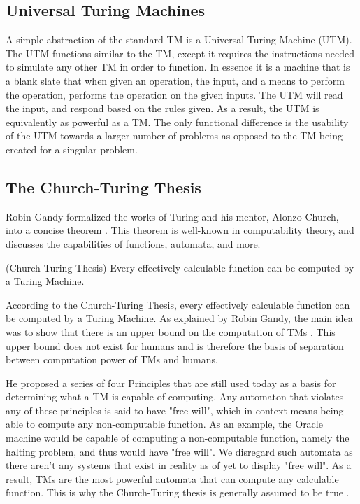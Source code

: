 \subsection{Universal Turing Machines}\label{subsec:UTM}

A simple abstraction of the standard TM is a Universal Turing Machine (UTM).
The UTM functions similar to the TM, except it requires the instructions needed to simulate any other TM in order to function.
In essence it is a machine that is a blank slate that when given an operation, the input, and a means to perform the operation, performs the operation on the given inputs.
The UTM will read the input, and respond based on the rules given.
As a result, the UTM is equivalently as powerful as a TM.
The only functional difference is the usability of the UTM towards a larger number of problems as opposed to the TM being created for a singular problem.

\subsection{The Church-Turing Thesis}\label{subsec:Church-Turing Thesis}

Robin Gandy formalized the works of Turing and his mentor, Alonzo Church, into a concise theorem \cite{GandyPaper}.
This theorem is well-known in computability theory, and discusses the capabilities of functions, automata, and more.

\begin{thm}
    \label{thm:CTT}
    (Church-Turing Thesis) Every effectively calculable function can be computed by a Turing Machine.
\end{thm}

According to the Church-Turing Thesis, every effectively calculable function can be computed by a Turing Machine.
As explained by Robin Gandy, the main idea was to show that there is an upper bound on the computation of TMs \cite{GandyPaper}.
This upper bound does not exist for humans and is therefore the basis of separation between computation power of TMs and humans.

He proposed a series of four Principles that are still used today as a basis for determining what a TM is capable of computing.
Any automaton that violates any of these principles is said to have "free will", which in context means being able to compute any non-computable function.
As an example, the Oracle machine would be capable of computing a non-computable function, namely the halting problem, and thus would have "free will".
We disregard such automata as there aren't any systems that exist in reality as of yet to display "free will".
As a result, TMs are the most powerful automata that can compute any calculable function.
This is why the Church-Turing thesis is generally assumed to be true \cite{GandyPaper}.

